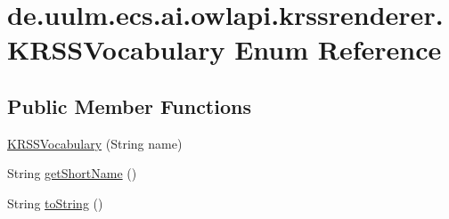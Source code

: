 \hypertarget{enumde_1_1uulm_1_1ecs_1_1ai_1_1owlapi_1_1krssrenderer_1_1_k_r_s_s_vocabulary}{\section{de.\-uulm.\-ecs.\-ai.\-owlapi.\-krssrenderer.\-K\-R\-S\-S\-Vocabulary Enum Reference}
\label{enumde_1_1uulm_1_1ecs_1_1ai_1_1owlapi_1_1krssrenderer_1_1_k_r_s_s_vocabulary}
}
\subsection*{Public Member Functions}
\begin{DoxyCompactItemize}
\item 
\hyperlink{enumde_1_1uulm_1_1ecs_1_1ai_1_1owlapi_1_1krssrenderer_1_1_k_r_s_s_vocabulary_a48d4fa2b3f1eb7587c074105a79286e5}{K\-R\-S\-S\-Vocabulary} (String name)
\item 
String \hyperlink{enumde_1_1uulm_1_1ecs_1_1ai_1_1owlapi_1_1krssrenderer_1_1_k_r_s_s_vocabulary_a8c8f8df908bfd98bb8d4be77b71cce3d}{get\-Short\-Name} ()
\item 
String \hyperlink{enumde_1_1uulm_1_1ecs_1_1ai_1_1owlapi_1_1krssrenderer_1_1_k_r_s_s_vocabulary_a11bcd70afe83569d120d7eb28dd754be}{to\-String} ()
\end{DoxyCompactItemize}
